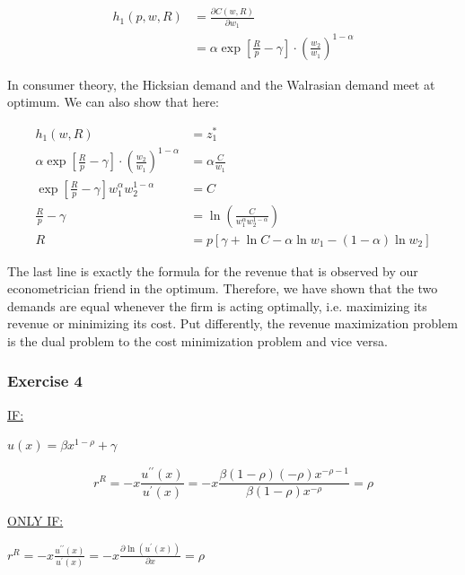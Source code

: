 {{\begin{enumerate}[label=(\alph*)]
{\begin{align*}
    h_1(p,w,R)&=\frac{\partial C\left(w,R\right)}{\partial w_1} \\
    &= \alpha \exp \left[\frac{R}{p}-\gamma\right] \cdot\left(\frac{w_2}{w_1}\right)^{1-\alpha}
\end{align*}
}
{\item 
In consumer theory, the Hicksian demand and the Walrasian demand meet at optimum. We can also show that here:

\begin{align*}
    h_1(w,R)&=z_1^* \\
    \alpha \exp \left[\frac{R}{p}-\gamma\right] \cdot\left(\frac{w_2}{w_1}\right)^{1-\alpha}&=\alpha \frac{C}{w_1}\\
    \exp \left[\frac{R}{p}-\gamma\right] w_1^\alpha w_2^{1-\alpha}&=C \\
    \frac{R}{p}-\gamma &= \ln \left(\frac{C}{w_1^\alpha w_2^{1-\alpha}} \right) \\
    R&=p\left[\gamma+\ln C-\alpha \ln w_1-(1-\alpha) \ln w_2\right]
\end{align*}

The last line is exactly the formula for the revenue that is observed by our econometrician friend in the optimum. Therefore, we have shown that the two demands are equal whenever the firm is acting optimally, i.e. maximizing its revenue or minimizing its cost. Put differently, the revenue maximization problem is the dual problem to the cost minimization problem and vice versa.
}
\end{enumerate}
}
{
\subsubsection*{Exercise 4}

\begin{enumerate}[label=(\alph*)]
{\item 
\underline{IF:}

$u(x)=\beta x^{1-\rho}+\gamma$

$$
r^{R}=-x \frac{u^{\prime \prime}(x)}{u^{\prime}(x)}=-x \frac{\beta(1-  \rho)(-\rho) x^{-\rho-1}}{\beta(1-\rho) x^{-\rho}}=\rho
$$

\underline{ONLY IF:}

$r^{R}=-x \frac{u^{\prime \prime}(x)}{u^{\prime}(x)}=-x \frac{\partial \ln \left(u^{\prime}(x)\right)}{\partial x}=\rho$

}
\end{enumerate}}}
